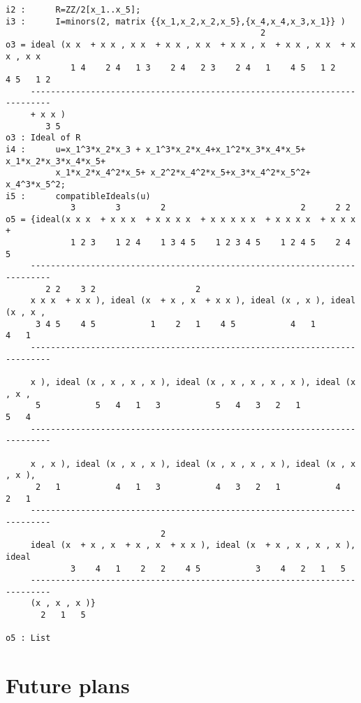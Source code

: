 \documentclass[11pt]{amsart}
\begin{document}
\begin{verbatim}
i2 :      R=ZZ/2[x_1..x_5]; 
i3 :      I=minors(2, matrix {{x_1,x_2,x_2,x_5},{x_4,x_4,x_3,x_1}} )
                                                   2
o3 = ideal (x x  + x x , x x  + x x , x x  + x x , x  + x x , x x  + x x , x x 
             1 4    2 4   1 3    2 4   2 3    2 4   1    4 5   1 2    4 5   1 2
     --------------------------------------------------------------------------
     + x x )
        3 5
o3 : Ideal of R
i4 :      u=x_1^3*x_2*x_3 + x_1^3*x_2*x_4+x_1^2*x_3*x_4*x_5+ x_1*x_2*x_3*x_4*x_5+ 
          x_1*x_2*x_4^2*x_5+ x_2^2*x_4^2*x_5+x_3*x_4^2*x_5^2+ x_4^3*x_5^2;
i5 :      compatibleIdeals(u)
             3        3        2                           2      2 2    
o5 = {ideal(x x x  + x x x  + x x x x  + x x x x x  + x x x x  + x x x  +
             1 2 3    1 2 4    1 3 4 5    1 2 3 4 5    1 2 4 5    2 4 5  
     --------------------------------------------------------------------------
        2 2    3 2                    2                                        
     x x x  + x x ), ideal (x  + x , x  + x x ), ideal (x , x ), ideal (x , x ,
      3 4 5    4 5           1    2   1    4 5           4   1           4   1 
     --------------------------------------------------------------------------
                                                                            
     x ), ideal (x , x , x , x ), ideal (x , x , x , x , x ), ideal (x , x ,
      5           5   4   1   3           5   4   3   2   1           5   4 
     --------------------------------------------------------------------------
                                                                             
     x , x ), ideal (x , x , x ), ideal (x , x , x , x ), ideal (x , x , x ),
      2   1           4   1   3           4   3   2   1           4   2   1  
     --------------------------------------------------------------------------
                               2
     ideal (x  + x , x  + x , x  + x x ), ideal (x  + x , x , x , x ), ideal
             3    4   1    2   2    4 5           3    4   2   1   5        
     --------------------------------------------------------------------------
     (x , x , x )}
       2   1   5

o5 : List
\end{verbatim}

\section{Future plans}



\end{document}
